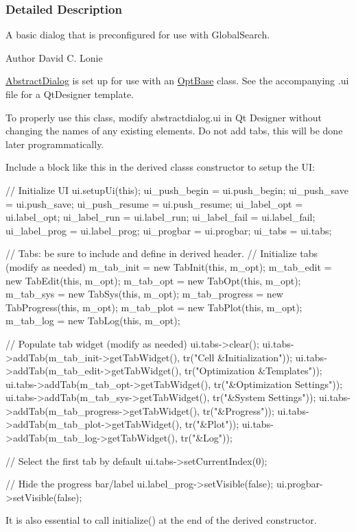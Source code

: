 \subsubsection{Detailed Description}
A basic dialog that is preconfigured for use with Global\+Search. 

\begin{DoxyAuthor}{Author}
David C. Lonie
\end{DoxyAuthor}
\hyperlink{classGlobalSearch_1_1AbstractDialog}{Abstract\+Dialog} is set up for use with an \hyperlink{classGlobalSearch_1_1OptBase}{Opt\+Base} class. See the accompanying .ui file for a Qt\+Designer template.

To properly use this class, modify abstractdialog.\+ui in Qt Designer without changing the names of any existing elements. Do not add tabs, this will be done later programmatically.

Include a block like this in the derived class\textquotesingle{}s constructor to setup the U\+I\+: \begin{DoxyVerb}    // Initialize UI
    ui.setupUi(this);
    ui_push_begin   = ui.push_begin;
    ui_push_save    = ui.push_save;
    ui_push_resume  = ui.push_resume;
    ui_label_opt    = ui.label_opt;
    ui_label_run    = ui.label_run;
    ui_label_fail   = ui.label_fail;
    ui_label_prog   = ui.label_prog;
    ui_progbar      = ui.progbar;
    ui_tabs         = ui.tabs;

    // Tabs: be sure to include and define in derived header.
    // Initialize tabs (modify as needed)
    m_tab_init     = new TabInit(this, m_opt);
    m_tab_edit     = new TabEdit(this, m_opt);
    m_tab_opt      = new TabOpt(this, m_opt);
    m_tab_sys      = new TabSys(this, m_opt);
    m_tab_progress = new TabProgress(this, m_opt);
    m_tab_plot     = new TabPlot(this, m_opt);
    m_tab_log      = new TabLog(this, m_opt);

    // Populate tab widget (modify as needed)
    ui.tabs->clear();
    ui.tabs->addTab(m_tab_init->getTabWidget(),     tr("Cell &Initialization"));
    ui.tabs->addTab(m_tab_edit->getTabWidget(),     tr("Optimization &Templates"));
    ui.tabs->addTab(m_tab_opt->getTabWidget(),      tr("&Optimization Settings"));
    ui.tabs->addTab(m_tab_sys->getTabWidget(),      tr("&System Settings"));
    ui.tabs->addTab(m_tab_progress->getTabWidget(), tr("&Progress"));
    ui.tabs->addTab(m_tab_plot->getTabWidget(),     tr("&Plot"));
    ui.tabs->addTab(m_tab_log->getTabWidget(),      tr("&Log"));

    // Select the first tab by default
    ui.tabs->setCurrentIndex(0);

    // Hide the progress bar/label
    ui.label_prog->setVisible(false);
    ui.progbar->setVisible(false);
\end{DoxyVerb}
 \begin{DoxyVerb} It is also essential to call initialize() at the end of the
 derived constructor.\end{DoxyVerb}
 

